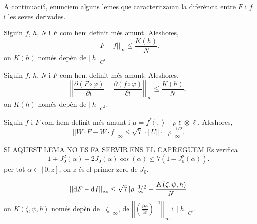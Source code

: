 A continuació, enunciem alguns lemes que caracteritzaran la diferència entre $F$ i $f$ i les seves derivades.

\begin{lema}
    \label{lema:C0-2D}
    Siguin $f$, $h$, $N$ i $F$ com hem definit més amunt. Aleshores,
    \begin{equation*}
        ||F-f||_\infty \le \frac{K(h)}{N},
    \end{equation*}
    on $K(h)$ només depèn de $||h||_{C^1}$.
\end{lema}

\begin{lema}
    \label{lema:lema3}
    Siguin $f$, $h$, $N$ i $F$ com hem definit més amunt. Aleshores,
    \begin{equation*}
        \left|\left|\frac{\partial (F\circ \varphi)}{\partial t}-\frac{\partial (f\circ \varphi)}{\partial t}\right|\right|_\infty \le \frac{K(h)}{N},
    \end{equation*}
    on $K(h)$ només depèn de $||h||_{C^2}$.
\end{lema}

\begin{lema}
    \label{lema:lema4}
    Siguin $f$ i $F$ com hem definit més amunt i $\mu = f^*\langle\cdot, \cdot\rangle + \rho\ell\otimes\ell$. Aleshores,
    \begin{equation*}
        \left|\left|W\cdot F-W\cdot f\right|\right|_\infty \le \sqrt7\cdot||U||\cdot||\rho||^{1/2}_\infty.
    \end{equation*}
\end{lema}

\begin{lema}
    {\color{blue} SI AQUEST LEMA NO ES FA SERVIR ENS EL CARREGUEM}
    Es verifica
    \begin{equation*}
        1+J_0^2(\alpha)-2J_0(\alpha)\cos(\alpha) \le 7(1-J_0^2(\alpha)).
    \end{equation*}
    per tot $\alpha\in[0,z]$, on $z$ és el primer zero de $J_0$.
\end{lema}

\begin{lema}
    \label{lema:lema6}
    \begin{equation*}
        \left|\left| \text dF -\text df \right|\right|_\infty \le \sqrt{7}||\rho||^{1/2}_\infty + \frac{K(\zeta,\psi,h)}{N}
    \end{equation*}
    on $K(\zeta,\psi,h)$ només depèn de $||\zeta||_\infty$, de $\left|\left|\left(  \frac{\partial\psi}{\partial t}\right)^{-1}\right|\right|_\infty$ i $||h||_{C^2}$.
\end{lema}

